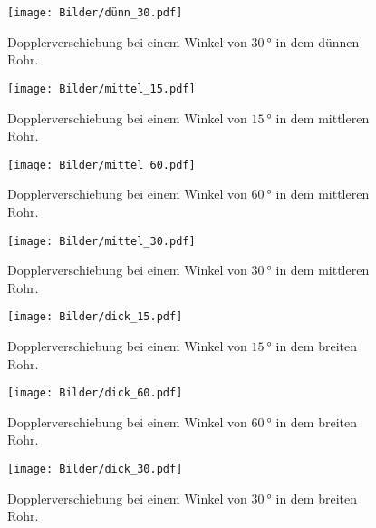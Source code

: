 \begin{figure}
	 \centering
	  \caption{Dopplerverschiebung bei einem Winkel von $\SI{30}{\degree}$ in dem dünnen Rohr.}
	   \texttt{[image: Bilder/dünn\_30.pdf]}
	    \label{fig:duenn_30}
\end{figure}

\begin{figure}
	 \centering
	  \caption{Dopplerverschiebung bei einem Winkel von $\SI{15}{\degree}$ in dem mittleren Rohr.}
	   \texttt{[image: Bilder/mittel\_15.pdf]}
	    \label{fig:mittel_15}
\end{figure}

\begin{figure}
	 \centering
	  \caption{Dopplerverschiebung bei einem Winkel von $\SI{60}{\degree}$ in dem mittleren Rohr.}
	   \texttt{[image: Bilder/mittel\_60.pdf]}
	    \label{fig:mittel_60}
\end{figure}

\begin{figure}
	 \centering
	  \caption{Dopplerverschiebung bei einem Winkel von $\SI{30}{\degree}$ in dem mittleren Rohr.}
	   \texttt{[image: Bilder/mittel\_30.pdf]}
	    \label{fig:mittel_30}
\end{figure}

\begin{figure}
	 \centering
	  \caption{Dopplerverschiebung bei einem Winkel von $\SI{15}{\degree}$ in dem breiten Rohr.}
	   \texttt{[image: Bilder/dick\_15.pdf]}
	    \label{fig:dick_15}
\end{figure}

\begin{figure}
	 \centering
	  \caption{Dopplerverschiebung bei einem Winkel von $\SI{60}{\degree}$ in dem breiten Rohr.}
	   \texttt{[image: Bilder/dick\_60.pdf]}
	    \label{fig:dick_60}
\end{figure}

\begin{figure}
	 \centering
	  \caption{Dopplerverschiebung bei einem Winkel von $\SI{30}{\degree}$ in dem breiten Rohr.}
	   \texttt{[image: Bilder/dick\_30.pdf]}
	    \label{fig:dick_30}
\end{figure}

